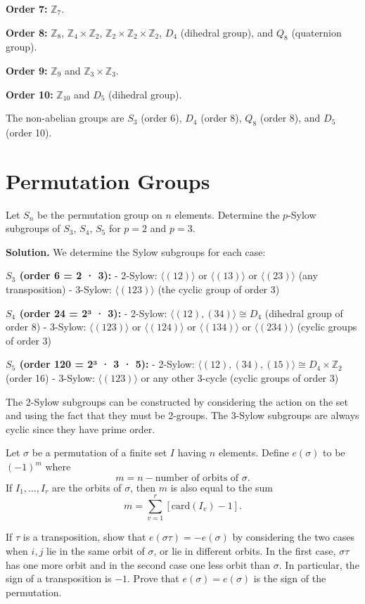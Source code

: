 \textbf{Order 7:} $\mathbb{Z}_7$.

\textbf{Order 8:} $\mathbb{Z}_8$, $\mathbb{Z}_4 \times \mathbb{Z}_2$, $\mathbb{Z}_2 \times \mathbb{Z}_2 \times \mathbb{Z}_2$, $D_4$ (dihedral group), and $Q_8$ (quaternion group).

\textbf{Order 9:} $\mathbb{Z}_9$ and $\mathbb{Z}_3 \times \mathbb{Z}_3$.

\textbf{Order 10:} $\mathbb{Z}_{10}$ and $D_5$ (dihedral group).

The non-abelian groups are $S_3$ (order 6), $D_4$ (order 8), $Q_8$ (order 8), and $D_5$ (order 10).

\section{Permutation Groups}

\begin{problembox}
Let $S_n$ be the permutation group on $n$ elements. Determine the $p$-Sylow subgroups of $S_3$, $S_4$, $S_5$ for $p = 2$ and $p = 3$.
\end{problembox}

\noindent\textbf{Solution.} We determine the Sylow subgroups for each case:

\textbf{$S_3$ (order 6 = 2 · 3):}
- 2-Sylow: $\langle (12) \rangle$ or $\langle (13) \rangle$ or $\langle (23) \rangle$ (any transposition)
- 3-Sylow: $\langle (123) \rangle$ (the cyclic group of order 3)

\textbf{$S_4$ (order 24 = 2³ · 3):}
- 2-Sylow: $\langle (12), (34) \rangle \cong D_4$ (dihedral group of order 8)
- 3-Sylow: $\langle (123) \rangle$ or $\langle (124) \rangle$ or $\langle (134) \rangle$ or $\langle (234) \rangle$ (cyclic groups of order 3)

\textbf{$S_5$ (order 120 = 2³ · 3 · 5):}
- 2-Sylow: $\langle (12), (34), (15) \rangle \cong D_4 \times \mathbb{Z}_2$ (order 16)
- 3-Sylow: $\langle (123) \rangle$ or any other 3-cycle (cyclic groups of order 3)

The 2-Sylow subgroups can be constructed by considering the action on the set and using the fact that they must be 2-groups. The 3-Sylow subgroups are always cyclic since they have prime order.

\begin{problembox}
Let $\sigma$ be a permutation of a finite set $I$ having $n$ elements. Define $e(\sigma)$ to be $(-1)^m$ where
\[m = n - \text{number of orbits of } \sigma.\]
If $I_1, \ldots, I_r$ are the orbits of $\sigma$, then $m$ is also equal to the sum
\[m = \sum_{v=1}^r [\text{card}(I_v) - 1].\]

If $\tau$ is a transposition, show that $e(\sigma\tau) = -e(\sigma)$ by considering the two cases when $i, j$ lie in the same orbit of $\sigma$, or lie in different orbits. In the first case, $\sigma\tau$ has one more orbit and in the second case one less orbit than $\sigma$. In particular, the sign of a transposition is $-1$. Prove that $e(\sigma) = e(\sigma)$ is the sign of the permutation.
\end{problembox}


